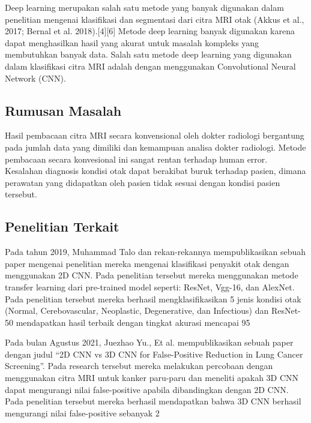 Deep learning merupakan salah satu metode yang banyak digunakan dalam penelitian mengenai klasifikasi dan segmentasi dari citra MRI otak (Akkus et al., 2017; Bernal et al. 2018).[4][6] Metode deep learning banyak digunakan karena dapat menghasilkan hasil yang akurat untuk masalah kompleks yang membutuhkan banyak data. Salah satu metode deep learning yang digunakan dalam klasifikasi citra MRI adalah dengan menggunakan Convolutional Neural Network (CNN).


\subsection{Rumusan Masalah}

Hasil pembacaan citra MRI secara konvensional oleh dokter radiologi bergantung pada jumlah data yang dimiliki dan kemampuan analisa dokter radiologi. Metode pembacaan secara konvesional ini sangat rentan terhadap human error. Kesalahan diagnosis kondisi otak dapat berakibat buruk terhadap pasien, dimana perawatan yang didapatkan oleh pasien tidak sesuai dengan kondisi pasien tersebut.

\subsection{Penelitian Terkait}

Pada tahun 2019, Muhammad Talo dan rekan-rekannya mempublikasikan sebuah paper mengenai penelitian mereka mengenai klasifikasi penyakit otak dengan menggunakan 2D CNN. Pada penelitian tersebut mereka menggunakan metode transfer learning dari pre-trained model seperti: ResNet, Vgg-16, dan AlexNet. Pada penelitian tersebut mereka berhasil mengklasifikasikan 5 jenis kondisi otak (Normal, Cerebovascular, Neoplastic, Degenerative, dan Infectious) dan ResNet-50 mendapatkan hasil terbaik dengan tingkat akurasi mencapai 95%
 
Pada bulan Agustus 2021, Juezhao Yu., Et al. mempublikasikan sebuah paper dengan judul “2D CNN vs 3D CNN for False-Positive Reduction in Lung Cancer Screening”. Pada research tersebut mereka melakukan percobaan dengan menggunakan citra MRI untuk kanker paru-paru dan meneliti apakah 3D CNN dapat mengurangi nilai false-positive apabila dibandingkan dengan 2D CNN. Pada penelitian tersebut mereka berhasil mendapatkan bahwa  3D CNN berhasil mengurangi nilai false-positive sebanyak 2%

